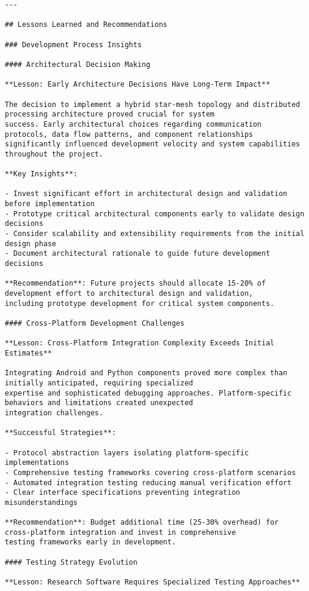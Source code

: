 \documentclass[11pt,a4paper]{report}
\begin{document}
\begin{verbatim}
---

## Lessons Learned and Recommendations

### Development Process Insights

#### Architectural Decision Making

**Lesson: Early Architecture Decisions Have Long-Term Impact**

The decision to implement a hybrid star-mesh topology and distributed processing architecture proved crucial for system
success. Early architectural choices regarding communication protocols, data flow patterns, and component relationships
significantly influenced development velocity and system capabilities throughout the project.

**Key Insights**:

- Invest significant effort in architectural design and validation before implementation
- Prototype critical architectural components early to validate design decisions
- Consider scalability and extensibility requirements from the initial design phase
- Document architectural rationale to guide future development decisions

**Recommendation**: Future projects should allocate 15-20% of development effort to architectural design and validation,
including prototype development for critical system components.

#### Cross-Platform Development Challenges

**Lesson: Cross-Platform Integration Complexity Exceeds Initial Estimates**

Integrating Android and Python components proved more complex than initially anticipated, requiring specialized
expertise and sophisticated debugging approaches. Platform-specific behaviors and limitations created unexpected
integration challenges.

**Successful Strategies**:

- Protocol abstraction layers isolating platform-specific implementations
- Comprehensive testing frameworks covering cross-platform scenarios
- Automated integration testing reducing manual verification effort
- Clear interface specifications preventing integration misunderstandings

**Recommendation**: Budget additional time (25-30% overhead) for cross-platform integration and invest in comprehensive
testing frameworks early in development.

#### Testing Strategy Evolution

**Lesson: Research Software Requires Specialized Testing Approaches**


\end{verbatim}
\end{document}
